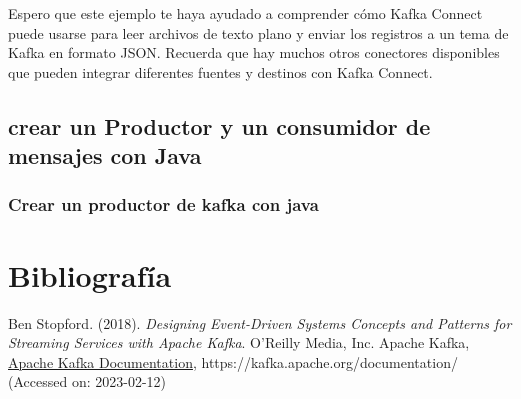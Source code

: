 \documentclass{article}
\begin{document}
Espero que este ejemplo te haya ayudado a comprender cómo Kafka Connect puede usarse para leer archivos de texto plano y enviar los registros a un tema de Kafka en formato JSON. Recuerda que hay muchos otros conectores disponibles que pueden integrar diferentes fuentes y destinos con Kafka Connect.

\subsection{crear un Productor y un consumidor de mensajes con Java}
\subsubsection{Crear un productor de kafka con java}










\newpage
\section{Bibliografía}
\begin{thebibliography}{9}
Ben Stopford. (2018). \textit{Designing Event-Driven Systems
Concepts and Patterns for Streaming
Services with Apache Kafka}. O'Reilly Media, Inc.
 Apache Kafka, 
\href{https://kafka.apache.org/documentation/}{Apache Kafka Documentation}, https://kafka.apache.org/documentation/ (Accessed on: 2023-02-12)
\end{thebibliography}
\end{document}
